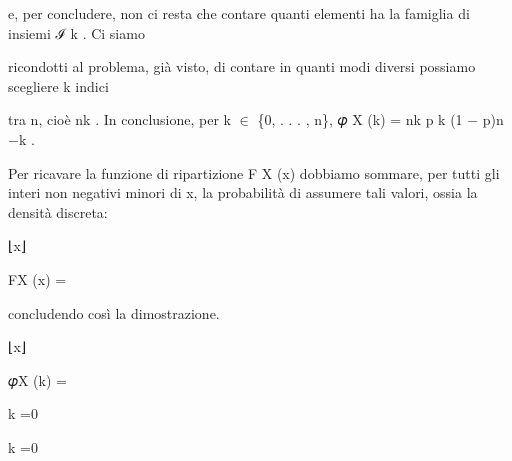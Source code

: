 \documentclass[a4paper,portrait,12pt]{article}
\begin{document}
\begin{flushleft}
e, per concludere, non ci resta che contare quanti elementi ha la famiglia di insiemi ℐ k . Ci siamo
\end{flushleft}


\begin{flushleft}
ricondotti al problema, gi\`{a} visto, di contare in quanti modi diversi possiamo scegliere k indici
\end{flushleft}


\begin{flushleft}
tra n, cio\`{e} nk . In conclusione, per k $\in$ \{0, . . . , n\}, 𝜑 X (k) = nk p k (1 $-$ p)n$-$k .
\end{flushleft}


\begin{flushleft}
Per ricavare la funzione di ripartizione F X (x) dobbiamo sommare, per tutti gli interi non negativi minori di x, la probabilit\`{a} di assumere tali valori, ossia la densit\`{a} discreta:
\end{flushleft}


\begin{flushleft}
⌊x⌋
\end{flushleft}





\begin{flushleft}
FX (x) =
\end{flushleft}


\begin{flushleft}
concludendo così la dimostrazione.
\end{flushleft}





\begin{flushleft}
⌊x⌋
\end{flushleft}





\begin{flushleft}
𝜑X (k) =
\end{flushleft}


\begin{flushleft}
k =0
\end{flushleft}





\begin{flushleft}
k =0
\end{flushleft}
\end{document}
